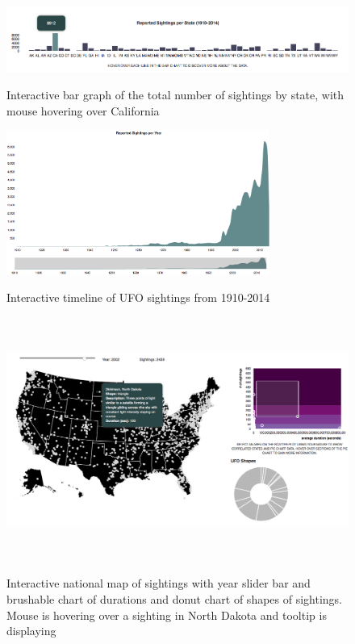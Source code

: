 \documentclass[journal]{vgtc}                %
\begin{document}
\begin{figure}
\centering
\caption{Interactive bar graph of the total number of sightings by state, with mouse hovering over California}
\includegraphics[width=\textwidth]{sightings_count.png}
\label{sightings}
\end{figure}

\begin{figure}
\centering
\caption{Interactive timeline of UFO sightings from 1910-2014}
\includegraphics[width=3.4in]{timeline.png}
\label{timeline}
\end{figure}

\begin{figure}
\centering
\caption{Interactive national map of sightings with year slider bar and brushable chart of durations and donut chart of shapes of sightings. Mouse is hovering over a sighting in North Dakota and tooltip is displaying }
\includegraphics[width=\textwidth,height=8cm]{map.png}
\label{map}
\end{figure}
\end{document}
